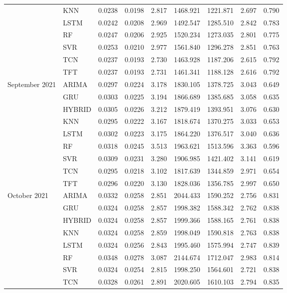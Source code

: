 \begin{tabular}{lllllllll}
 & KNN & 0.0238 & 0.0198 & 2.817 & 1468.921 & 1221.871 & 2.697 & 0.790 \\
 & LSTM & 0.0242 & 0.0208 & 2.969 & 1492.547 & 1285.510 & 2.842 & 0.783 \\
 & RF & 0.0247 & 0.0206 & 2.925 & 1520.234 & 1273.035 & 2.801 & 0.775 \\
 & SVR & 0.0253 & 0.0210 & 2.977 & 1561.840 & 1296.278 & 2.851 & 0.763 \\
 & TCN & 0.0237 & 0.0193 & 2.730 & 1463.928 & 1187.206 & 2.615 & 0.792 \\
 & TFT & 0.0237 & 0.0193 & 2.731 & 1461.341 & 1188.128 & 2.616 & 0.792 \\
September 2021 & ARIMA & 0.0297 & 0.0224 & 3.178 & 1830.105 & 1378.725 & 3.043 & 0.649 \\
 & GRU & 0.0303 & 0.0225 & 3.194 & 1866.689 & 1385.685 & 3.058 & 0.635 \\
 & HYBRID & 0.0305 & 0.0226 & 3.212 & 1879.419 & 1393.951 & 3.076 & 0.630 \\
 & KNN & 0.0295 & 0.0222 & 3.167 & 1818.674 & 1370.275 & 3.033 & 0.653 \\
 & LSTM & 0.0302 & 0.0223 & 3.175 & 1864.220 & 1376.517 & 3.040 & 0.636 \\
 & RF & 0.0318 & 0.0245 & 3.513 & 1963.621 & 1513.596 & 3.363 & 0.596 \\
 & SVR & 0.0309 & 0.0231 & 3.280 & 1906.985 & 1421.402 & 3.141 & 0.619 \\
 & TCN & 0.0295 & 0.0218 & 3.102 & 1817.639 & 1344.859 & 2.971 & 0.654 \\
 & TFT & 0.0296 & 0.0220 & 3.130 & 1828.036 & 1356.785 & 2.997 & 0.650 \\
October 2021 & ARIMA & 0.0332 & 0.0258 & 2.851 & 2044.433 & 1590.252 & 2.756 & 0.831 \\
 & GRU & 0.0324 & 0.0258 & 2.857 & 1998.382 & 1588.342 & 2.762 & 0.838 \\
 & HYBRID & 0.0324 & 0.0258 & 2.857 & 1999.366 & 1588.165 & 2.761 & 0.838 \\
 & KNN & 0.0324 & 0.0258 & 2.859 & 1998.049 & 1590.818 & 2.763 & 0.838 \\
 & LSTM & 0.0324 & 0.0256 & 2.843 & 1995.460 & 1575.994 & 2.747 & 0.839 \\
 & RF & 0.0348 & 0.0278 & 3.087 & 2144.674 & 1712.047 & 2.983 & 0.814 \\
 & SVR & 0.0324 & 0.0254 & 2.815 & 1998.250 & 1564.601 & 2.721 & 0.838 \\
 & TCN & 0.0328 & 0.0261 & 2.891 & 2020.605 & 1610.103 & 2.794 & 0.835 \\

\end{tabular}
